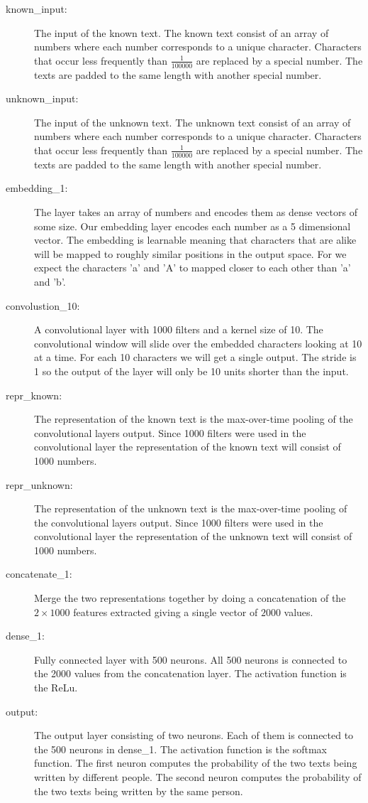 \begin{description}
    \item[known\_input:] The input of the known text. The known text consist of
        an array of numbers where each number corresponds to a unique character.
        Characters that occur less frequently than $\frac{1}{100000}$ are
        replaced by a special number. The texts are padded to the same length
        with another special number.
    \item[unknown\_input:] The input of the unknown text. The unknown text
        consist of an array of numbers where each number corresponds to a unique
        character. Characters that occur less frequently than $\frac{1}{100000}$
        are replaced by a special number. The texts are padded to the same
        length with another special number. 
    \item[embedding\_1:] The layer takes an array of numbers and encodes them as
        dense vectors of some size. Our embedding layer encodes each number as a
        5 dimensional vector. The embedding is learnable meaning that characters
        that are alike will be mapped to roughly similar positions in the output
        space. For we expect the characters 'a' and 'A' to mapped closer to each
        other than 'a' and 'b'.
    \item[convolustion\_10:] A convolutional layer with 1000 filters and a
        kernel size of 10. The convolutional window will slide over the embedded
        characters looking at 10 at a time. For each 10 characters we will get a
        single output. The stride is 1 so the output of the layer will only be
        10 units shorter than the input.
    \item[repr\_known:] The representation of the known text is the
        max-over-time pooling of the convolutional layers output. Since 1000
        filters were used in the convolutional layer the representation of the
        known text will consist of 1000 numbers.
    \item[repr\_unknown:] The representation of the unknown text is the
        max-over-time pooling of the convolutional layers output. Since 1000
        filters were used in the convolutional layer the representation of the
        unknown text will consist of 1000 numbers.
    \item[concatenate\_1:] Merge the two representations together by doing a
        concatenation of the $2 \times 1000$ features extracted giving a single
        vector of $2000$ values.
    \item[dense\_1:] Fully connected layer with 500 neurons. All 500 neurons is
        connected to the 2000 values from the concatenation layer. The
        activation function is the \gls{ReLu}.
    \item[output:] The output layer consisting of two neurons. Each of them is
        connected to the 500 neurons in dense\_1. The activation function is the
        softmax function. The first neuron computes the probability of the two
        texts being written by different people. The second neuron computes the
        probability of the two texts being written by the same person.
\end{description}

